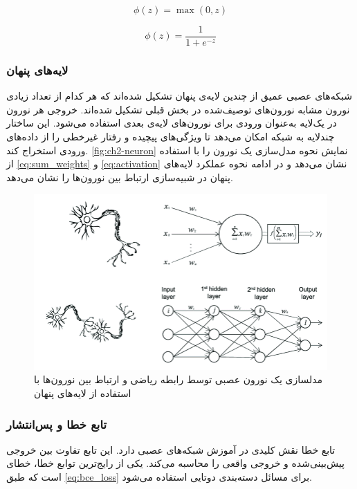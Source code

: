 \begin{latin}
\begin{equation}
\label{eq:relu}
\phi(z) = \max(0, z)
\end{equation}
\end{latin}

\begin{latin}
\begin{equation}
\label{eq:sigmoid}
\phi(z) = \frac{1}{1 + e^{-z}}
\end{equation}
\end{latin}


\subsubsection{لایه‌های پنهان}
شبکه‌های عصبی عمیق از چندین لایه‌ی پنهان تشکیل شده‌اند که هر کدام از تعداد زیادی نورون مشابه نورون‌های توصیف‌شده در بخش قبلی تشکیل شده‌اند. خروجی هر نورون در یک‌لایه به‌عنوان ورودی برای نورون‌های لایه‌ی بعدی استفاده می‌شود. این ساختار چندلایه به شبکه امکان می‌دهد تا ویژگی‌های پیچیده و  رفتار غیرخطی را از داده‌های ورودی استخراج کند.
\autoref{fig:ch2-neuron}
نمایش نحوه مدل‌سازی یک نورون را با استفاده از 
\autoref{eq:sum_weights} و \autoref{eq:activation}
نشان می‌دهد و در ادامه نحوه عملکرد لایه‌های پنهان در شبیه‌سازی ارتباط بین نورون‌ها را نشان می‌دهد. 
\begin{figure}[h]
\centering
\includegraphics[width=1.0\linewidth]{Images/Chapter2/neuron}
\caption{مدلسازی یک نورون عصبی توسط رابطه ریاضی و ارتباط بین نورون‌ها با استفاده از لایه‌های پنهان
\cite{brainmentorsIntroductionDeep}}
\label{fig:ch2-neuron}
\end{figure}


\subsubsection{تابع خطا و پس‌انتشار
\protect{}}
تابع خطا
  نقش کلیدی در آموزش شبکه‌های عصبی دارد. این تابع تفاوت بین خروجی پیش‌بینی‌شده
   و خروجی واقعی
     را محاسبه می‌کند. یکی از رایج‌ترین توابع خطا، خطای 
   است که طبق 
   \autoref{eq:bce_loss}
   برای مسائل دسته‌بندی دوتایی استفاده می‌شود.

